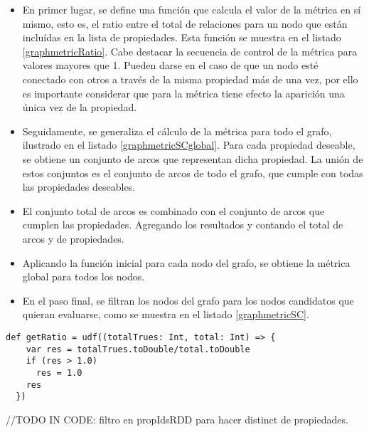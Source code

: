 \begin{itemize}
\item En primer lugar, se define una función que calcula el valor de la métrica en sí
mismo, esto es, el ratio entre el total de relaciones para un nodo que están
incluídas en la lista de propiedades. Esta función se muestra en el listado
\ref{graphmetricRatio}. Cabe destacar la secuencia de control de la métrica para
valores mayores que 1. Pueden darse en el caso de que un nodo esté conectado con
otros a través de la misma propiedad más de una vez, por ello es importante
considerar que para la métrica tiene efecto la aparición una única vez de la
propiedad. 
\item Seguidamente, se generaliza el cálculo de la métrica para todo el grafo,
ilustrado en el listado \ref{graphmetricSCglobal}. Para
cada propiedad deseable, se obtiene un conjunto de arcos que representan dicha
propiedad. La unión de estos conjuntos es el conjunto de arcos de todo el
grafo, que cumple con todas las propiedades deseables. 
\item El conjunto total de arcos es combinado con el conjunto de arcos que cumplen las
propiedades. Agregando los resultados y contando el total de arcos y de
propiedades. 
\item Aplicando la función inicial para cada nodo del grafo, se obtiene la métrica
global para todos los nodos. 
\item En el paso final, se filtran los nodos del grafo para los nodos candidatos que
quieran evaluarse, como se muestra en el listado \ref{graphmetricSC}.

\end{itemize}

\lstset{escapechar=@,language=scala}
\begin{lstlisting}[caption={Cálculo del ratio},captionpos=b, label=graphmetricRatio]
  def getRatio = udf((totalTrues: Int, total: Int) => {
    var res = totalTrues.toDouble/total.toDouble
    if (res > 1.0)
      res = 1.0
    res
  })
\end{lstlisting}


//TODO IN CODE: filtro en propIdsRDD para hacer distinct de propiedades. 

